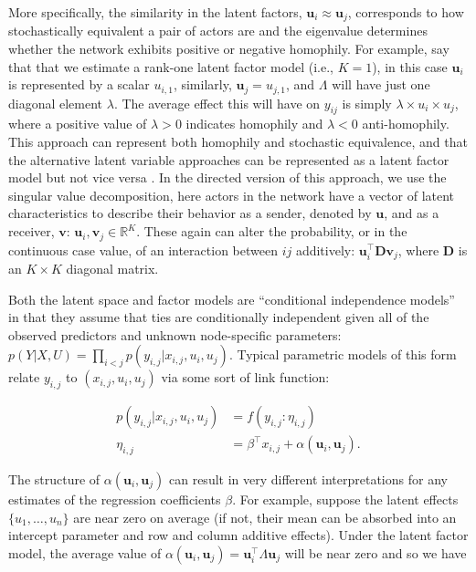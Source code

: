 \documentclass[9pt,twocolumn,twoside,lineno]{pnas-new}
\begin{document}
More specifically, the similarity in the latent factors, $\textbf{u}_{i} \approx \textbf{u}_{j}$, corresponds to how stochastically equivalent a pair of actors are and the eigenvalue determines whether the network exhibits positive or negative homophily. For example, say that that we estimate a rank-one latent factor model (i.e., $K=1$), in this case $\textbf{u}_{i}$ is represented by a scalar $u_{i,1}$, similarly, $\textbf{u}_{j}=u_{j,1}$, and $\Lambda$ will have just one diagonal element $\lambda$. The average effect this will have on $y_{ij}$ is simply $\lambda \times u_{i} \times u_{j}$, where a positive value of $\lambda>0$ indicates homophily and $\lambda<0$ anti-homophily. This approach can represent both homophily and stochastic equivalence, and that the alternative latent variable approaches can be represented as a latent factor model but not vice versa \cite{hoff:2008}. In the directed version of this approach, we use the singular value decomposition, here actors in the network have a vector of latent characteristics to describe their behavior as a sender, denoted by $\textbf{u}$, and as a receiver, $\textbf{v}$: $\textbf{u}_{i}, \textbf{v}_{j} \in \mathbb{R}^{K}$. These again can alter the probability, or in the continuous case value, of an interaction between $ij$ additively: $\textbf{u}_{i}^{\top} \textbf{D} \textbf{v}_{j}$, where $\textbf{D}$ is an $K \times K$ diagonal matrix.

Both the latent space and factor models are ``conditional independence models'' in that they assume that ties are conditionally independent given all of the observed predictors and unknown node-specific parameters: $p( Y | X , U ) = \prod_{i<j} p( y_{i,j}  | x_{i,j} , u_i , u_j)$. Typical parametric models of this form relate $y_{i,j}$ to $(x_{i,j},u_i,u_j)$ via some sort of link function:

\begin{align*}
	p(y_{i,j} | x_{i,j}, u_i , u_j ) & = f( y_{i,j} : \eta_{i,j} ) \\
	\eta_{i,j} &= \beta^\top x_{i,j} + \alpha(\textbf{u}_{i}, \textbf{u}_{j}).
\end{align*}

The structure of $\alpha(\textbf{u}_{i}, \textbf{u}_{j})$ can result in very different interpretations for any estimates of the regression coefficients $\beta$. For example, suppose the latent effects $\{ u_1,\ldots, u_n\}$ are near zero on average (if not, their mean can be absorbed into an intercept parameter and row and column additive effects). Under the latent factor model, the average value of $\alpha(\textbf{u}_{i}, \textbf{u}_{j}) = \textbf{u}_{i}^{\top} \Lambda \textbf{u}_{j}$ will be near zero and so we have
\end{document}
